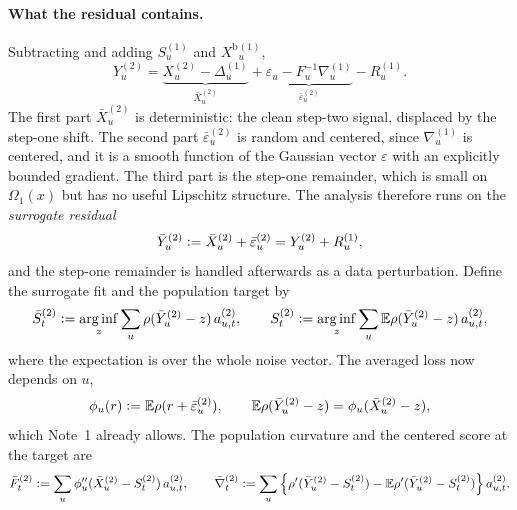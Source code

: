 \documentclass[11pt]{article}
\newcommand{\E}{\mathbb{E}}
\newcommand{\eqdef}{\mathrel{\vcentcolon=}}
\newcommand{\arginf}{\mathop{\mathrm{arg\,inf}}}
\newcommand{\rhohu}{\rho}
\newcommand{\Signal}{X}
\newcommand{\Data}{Y}
\newcommand{\IMFs}{S}
\newcommand{\IMFb}{\bar S}
\newcommand{\BiasedSignal}{X^{\mathrm b}}
\newcommand{\IF}{F}
\theoremstyle{definition}
\begin{document}
\paragraph{What the residual contains.}
Subtracting and adding \(\IMFs^{(1)}_u\) and \(\BiasedSignal{}^{(1)}_u\),
\begin{equation}
  \Data^{(2)}_u
  =\underbrace{\Signal^{(2)}_u-\Delta^{(1)}_u}_{\bar\Signal^{(2)}_u}
   +\underbrace{\varepsilon_u-\IF_u^{-1}\nabla^{(1)}_u}_{\bar\varepsilon^{(2)}_u}
   -R^{(1)}_u.
  \label{eq:residual-split}
\end{equation}
The first part \(\bar\Signal^{(2)}_u\) is deterministic: the clean step-two
signal, displaced by the step-one shift.  The second part
\(\bar\varepsilon^{(2)}_u\) is random and centered, since \(\nabla^{(1)}_u\)
is centered, and it is a smooth function of the Gaussian vector
\(\varepsilon\) with an explicitly bounded gradient.  The third part is the
step-one remainder, which is small on \(\Omega_1(x)\) but has no useful
Lipschitz structure.  The analysis therefore runs on the \emph{surrogate
residual}
\begin{equation}
  \bar\Data^{(2)}_u\eqdef\bar\Signal^{(2)}_u+\bar\varepsilon^{(2)}_u
  =\Data^{(2)}_u+R^{(1)}_u,
  \label{eq:surrogate}
\end{equation}
and the step-one remainder is handled afterwards as a data perturbation.
Define the surrogate fit and the population target by
\begin{equation}
  \IMFb^{(2)}_t
    \eqdef\arginf_z\sum_u\rhohu(\bar\Data^{(2)}_u-z)\,a^{(2)}_{u,t},
  \qquad
  \IMFs^{(2)}_t
    \eqdef\arginf_z\sum_u\E\rhohu(\bar\Data^{(2)}_u-z)\,a^{(2)}_{u,t},
  \label{eq:step2-targets}
\end{equation}
where the expectation is over the whole noise vector.  The averaged loss
now depends on \(u\),
\begin{equation}
  \phi_u(r)\eqdef\E\rhohu(r+\bar\varepsilon^{(2)}_u),
  \qquad
  \E\rhohu(\bar\Data^{(2)}_u-z)=\phi_u(\bar\Signal^{(2)}_u-z),
  \label{eq:phi-u}
\end{equation}
which Note~1 already allows.  The population curvature and the centered
score at the target are
\begin{equation}
  \bar\IF^{(2)}_t\eqdef\sum_u\phi_u''(\bar\Signal^{(2)}_u-\IMFs^{(2)}_t)\,a^{(2)}_{u,t},
  \qquad
  \bar\nabla^{(2)}_t\eqdef\sum_u\left\{
    \rhohu'(\bar\Data^{(2)}_u-\IMFs^{(2)}_t)
    -\E\rhohu'(\bar\Data^{(2)}_u-\IMFs^{(2)}_t)\right\}a^{(2)}_{u,t}.
  \label{eq:step2-curvature-score}
\end{equation}
\end{document}
